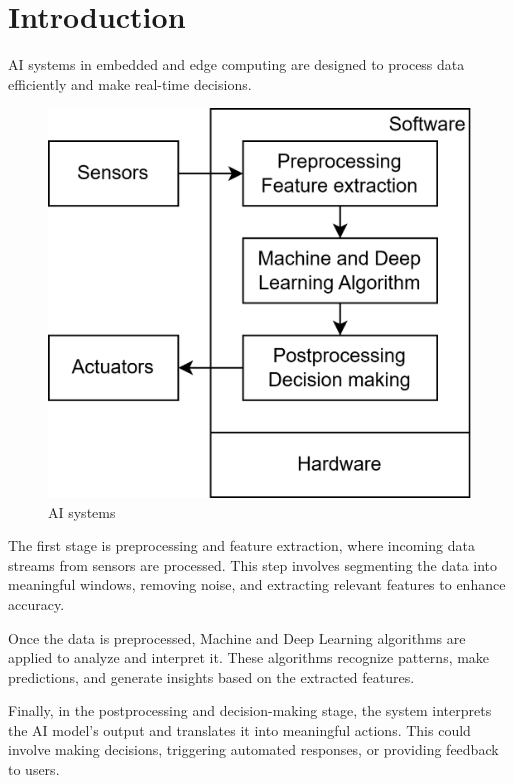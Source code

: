 \section{Introduction}

AI systems in embedded and edge computing are designed to process data efficiently and make real-time decisions.
\begin{figure}[H]
    \centering
    \includegraphics[width=0.4\linewidth]{images/eeai3.png}
    \caption{AI systems}
\end{figure}
The first stage is preprocessing and feature extraction, where incoming data streams from sensors are processed. 
This step involves segmenting the data into meaningful windows, removing noise, and extracting relevant features to enhance accuracy.

Once the data is preprocessed, Machine and Deep Learning algorithms are applied to analyze and interpret it.
These algorithms recognize patterns, make predictions, and generate insights based on the extracted features.

Finally, in the postprocessing and decision-making stage, the system interprets the AI model's output and translates it into meaningful actions. 
This could involve making decisions, triggering automated responses, or providing feedback to users.